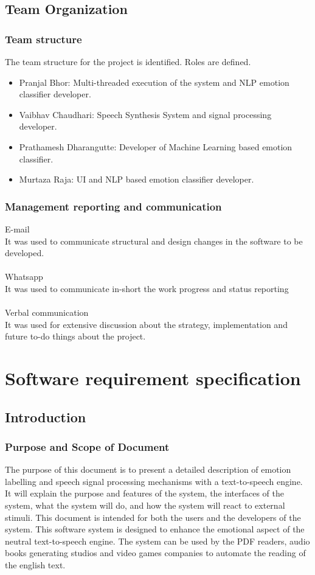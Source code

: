 \documentclass[oneside,a4paper,12pt]{book}
\begin{document}
 
\section{Team Organization}  
\subsection{Team structure}
The team structure for the project is identified. Roles are defined.
\begin{itemize}
	\item[] Pranjal Bhor: Multi-threaded execution of the system and NLP emotion classifier developer.
	\item[] Vaibhav Chaudhari: Speech Synthesis System and signal processing developer.
	\item[] Prathamesh Dharangutte: Developer of Machine Learning based emotion classifier.
	\item[] Murtaza Raja: UI and NLP based emotion classifier developer.
\end{itemize}

\subsection{Management reporting and communication}
 E-mail\\
		It was used to communicate structural and design changes in the software to be developed. \\	\\	
 Whatsapp\\
		It was used to communicate in-short the work progress and status reporting\\\\
Verbal communication\\
		It was used for extensive discussion about the strategy, implementation and future to-do things about the project.

 
\chapter{Software requirement specification  }

\section{Introduction}
\subsection{Purpose and Scope of Document}
The purpose of this document is to present a detailed description of emotion labelling and speech signal processing mechanisms with a text-to-speech engine. It will explain the purpose and features of the system, the interfaces of the system, what the system will
do, and how the system will react to external stimuli. This document is intended for
both the users and the developers of the system.
This software system is designed to enhance the emotional aspect of the neutral text-to-speech engine. The system can be used by the PDF readers, audio books generating studios and video games companies to automate the reading of the english text. 
\end{document}
